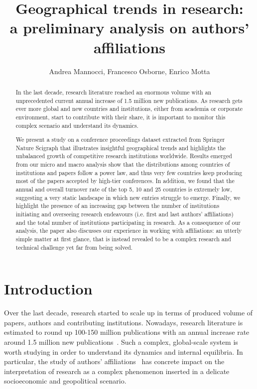 \documentclass{llncs}
\begin{document}
\title{Geographical trends in research: \\a preliminary analysis on authors' affiliations}

\author{Andrea Mannocci, Francesco Osborne, Enrico Motta}

\maketitle  %
\begin{abstract}
In the last decade, research literature reached an enormous volume with an unprecedented current annual increase of 1.5 million new publications. 
As research gets ever more global and new countries and institutions, either from academia or corporate environment, start to contribute with their share, it is important to monitor this complex scenario and understand its dynamics.

We present a study on a conference proceedings dataset extracted from Springer Nature Scigraph that illustrates insightful geographical trends and highlights the unbalanced growth of competitive research institutions worldwide.
Results emerged from our micro and macro analysis show that the distributions among countries of institutions and papers follow a power law, and thus very few countries keep producing most of the papers accepted by high-tier conferences.
In addition, we found that the annual and overall turnover rate of the top 5, 10 and 25 countries is extremely low, suggesting a very static landscape in which new entries struggle to emerge. 
Finally, we highlight the presence of an increasing gap between the number of institutions initiating and overseeing research endeavours (i.e. first and last authors' affiliations) and the total number of institutions participating in research.
As a consequence of our analysis, the paper also discusses our experience in working with affiliations: an utterly simple matter at first glance, that is instead revealed to be a complex research and technical challenge yet far from being solved.
\end{abstract}


%
\section{Introduction}
Over the last decade, research started to scale up in terms of produced volume of papers, authors and contributing institutions. 
Nowadays, research literature is estimated to round up 100-150 million publications with an annual increase rate around 1.5 million new publications~\cite{Bornmann2015}.
Such a complex, global-scale system is worth studying in order to understand its dynamics and internal equilibria.
In particular, the study of authors' affiliations~\cite{frenken2009,pan2012} has concrete impact on the interpretation of research as a complex phenomenon inserted in a delicate socioeconomic and geopolitical scenario.
\end{document}
